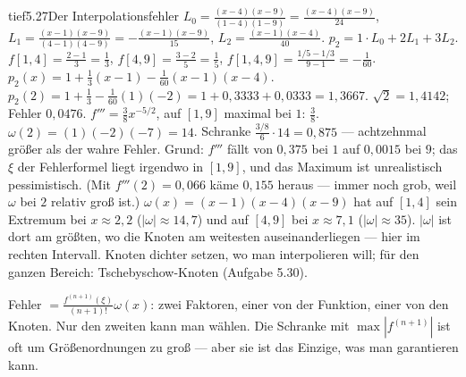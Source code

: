 \begin{loesungkarte}{tief}{5.27}{Der Interpolationsfehler}
$L_0 = \frac{(x - 4)(x - 9)}{(1 - 4)(1 - 9)} = \frac{(x - 4)(x - 9)}{24}$, $L_1 = \frac{(x - 1)(x - 9)}{(4 - 1)(4 - 9)} = -\frac{(x - 1)(x - 9)}{15}$, $L_2 = \frac{(x - 1)(x - 4)}{40}$. $p_2 = 1\cdot L_0 + 2L_1 + 3L_2$.
$f[1, 4] = \frac{2 - 1}3 = \frac13$, $f[4, 9] = \frac{3 - 2}5 = \frac15$, $f[1, 4, 9] = \frac{1/5 - 1/3}{9 - 1} = -\frac1{60}$. $p_2(x) = 1 + \frac13(x - 1) - \frac1{60}(x - 1)(x - 4)$.
$p_2(2) = 1 + \frac13 - \frac1{60}(1)(-2) = 1 + 0{,}3333 + 0{,}0333 = 1{,}3667$. $\sqrt2 = 1{,}4142$; Fehler $0{,}0476$.
$f''' = \frac38x^{-5/2}$, auf $[1, 9]$ maximal bei $1$: $\frac38$. $\omega(2) = (1)(-2)(-7) = 14$. Schranke $\frac{3/8}{6}\cdot14 = 0{,}875$ --- achtzehnmal größer als der wahre Fehler. Grund: $f'''$ fällt von $0{,}375$ bei $1$ auf $0{,}0015$ bei $9$; das $\xi$ der Fehlerformel liegt irgendwo in $[1, 9]$, und das Maximum ist unrealistisch pessimistisch. (Mit $f'''(2) = 0{,}066$ käme $0{,}155$ heraus --- immer noch grob, weil $\omega$ bei $2$ relativ groß ist.)
$\omega(x) = (x - 1)(x - 4)(x - 9)$ hat auf $[1, 4]$ sein Extremum bei $x\approx2{,}2$ ($|\omega|\approx14{,}7$) und auf $[4, 9]$ bei $x\approx7{,}1$ ($|\omega|\approx35$). $|\omega|$ ist dort am größten, wo die Knoten am weitesten auseinanderliegen --- hier im rechten Intervall. Knoten dichter setzen, wo man interpolieren will; für den ganzen Bereich: Tschebyschow-Knoten (Aufgabe 5.30).
\begin{mitnehmen}\kastentext
Fehler $= \frac{f^{(n+1)}(\xi)}{(n + 1)!}\omega(x)$: zwei Faktoren, einer von der Funktion, einer von den Knoten. Nur den zweiten kann man wählen. Die Schranke mit $\max|f^{(n+1)}|$ ist oft um Größenordnungen zu groß --- aber sie ist das Einzige, was man garantieren kann.
\end{mitnehmen}
\end{loesungkarte}

